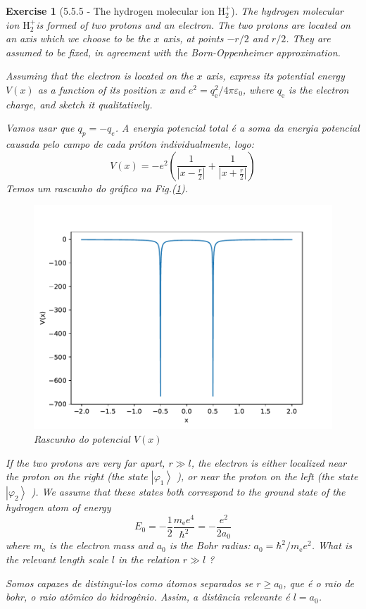 \documentclass[12pt]{article}
\def\be{\begin{equation}}
\def\ee{\end{equation}}
\def\f{\frac}
\def\l{\left}
\def\r{\right}
\newtheorem{exercise}{Exercise}
\begin{document}
	\begin{exercise}[5.5.5 - The hydrogen molecular ion $\mathrm{H}_{2}^{+}$]
		The hydrogen molecular ion $\mathrm{H}_{2}^{+}$is formed of two protons and an electron. The two protons are located on an axis which we choose to be the $x$ axis, at points $-r / 2$ and $r / 2$. They are assumed to be fixed, in agreement with the Born-Oppenheimer approximation.
		\begin{exercises}
			\item Assuming that the electron is located on the $x$ axis, express its potential energy $V(x)$ as a function of its position $x$ and $e^{2}=q_{\mathrm{e}}^{2} / 4 \pi \varepsilon_{0}$, where $q_{\mathrm{e}}$ is the electron charge, and sketch it qualitatively.
			\begin{multianswer}
				Vamos usar que $q_p=-q_e$. A energia potencial total é a soma da energia potencial causada pelo campo de cada próton individualmente, logo:
				\be
					V(x) = -e^2\l( \f{1}{\l|x - \f{r}{2}\r|} + \f{1}{\l|x + \f{r}{2}\r|}\r) 
				\ee
				Temos um rascunho do gráfico na Fig.(\ref{fig:graphofpotential}). 
				\begin{figure}
					\centering
					\includegraphics[width=0.7\linewidth]{Images/graph_of_potential}
					\caption[]{Rascunho do potencial $V(x)$}
					\label{fig:graphofpotential}
				\end{figure}
			\end{multianswer}

			\item If the two protons are very far apart, $r \gg l$, the electron is either localized near the proton on the right (the state $\left|\varphi_{1}\right\rangle$ ), or near the proton on the left (the state $\left|\varphi_{2}\right\rangle$ ). We assume that these states both correspond to the ground state of the hydrogen atom of energy
			$$
			E_{0}=-\frac{1}{2} \frac{m_{\mathrm{e}} e^{4}}{\hbar^{2}}=-\frac{e^{2}}{2 a_{0}}
			$$
			where $m_{\mathrm{e}}$ is the electron mass and $a_{0}$ is the Bohr radius: $a_{0}=\hbar^{2} / m_{\mathrm{e}} e^{2}$. What is the relevant length scale $l$ in the relation $r \gg l$ ?
			\begin{multianswer}
				Somos capazes de distingui-los como átomos separados se $r\geq a_0$, que é o raio de bohr, o raio atômico do hidrogênio. Assim, a distância relevante é $l=a_0$. 				
			\end{multianswer}


\end{exercises}
\end{exercise}
\end{document}
